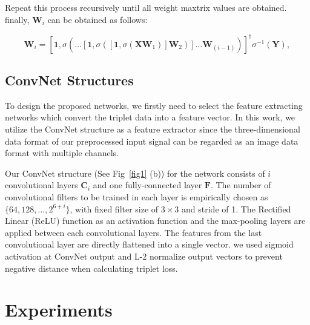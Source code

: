 \documentclass[runningheads]{llncs}
\begin{document}
Repeat this process recursively until all weight maxtrix values are obtained.
finally, $\mathbf{W}_{i}$ can be obtained as follows:

\begin{equation}
    \mathbf{W}_{i} = \left[\mathbf{1},\sigma\left(\dots\left[\mathbf{1},\sigma\left(\left[\mathbf{1},\sigma\left(\mathbf{X}\mathbf{W}_{1}\right)\right]\mathbf{W}_{2}\right)\right]\dots\mathbf{W}_{(i-1)}\right)\right]^{\dagger}\sigma^{-1}\left(\mathbf{Y}\right),
\end{equation}


\subsection{ConvNet Structures}

To design the proposed networks, we firstly need to select the feature extracting networks which convert the triplet data into a feature vector. In this work, we utilize the ConvNet structure \cite{lecun1998gradient} as a feature extractor since the three-dimensional data format of our preprocessed input signal can be regarded as an image data format with multiple channels. 

Our ConvNet structure (See Fig~\ref{fig1} (b)) for the network consists of $i$ convolutional layers $\mathbf{C}_{i}$ and one fully-connected layer $\mathbf{F}$. The number of convolutional filters to be trained in each layer is empirically chosen as $\{64, 128, ...,  2^{6+i}\}$, with fixed filter size of $3\times3$ and stride of 1. The Rectiﬁed Linear (ReLU) function as an activation function and the max-pooling layers are applied between each convolutional layers. The features from the last convolutional layer are directly flattened into a single vector.
we used sigmoid activation at ConvNet output and L-2 normalize output vectors to prevent negative distance when calculating triplet loss.


\section{Experiments}

\end{document}
